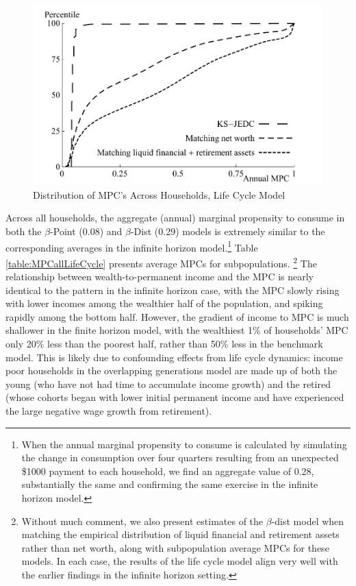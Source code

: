 \documentclass[11pt,a4paper,pdftex]{article}\usepackage[pdftex]{graphicx}\usepackage{epstopdf} \usepackage[pdftex]{hyperref}
\newcommand{\Discount}{\ensuremath{\beta}}
\begin{document}
\begin{figure}
\caption{Distribution of MPC's Across Households, Life Cycle Model}
\begin{center}
\includegraphics[scale=0.75]{../Figures/MPCdistributionLifeCyclePlot.pdf}
\end{center}
\end{figure}

Across all households, the aggregate (annual) marginal propensity to consume in both the \Discount-Point (0.08) and \Discount-Dist (0.29) models is extremely similar to the corresponding averages in the infinite horizon model.\footnote{When the annual marginal propensity to consume is calculated by simulating the change in consumption over four quarters resulting from an unexpected \$1000 payment to each household, we find an aggregate value of 0.28, substantially the same and confirming the same exercise in the infinite horizon model.}  Table \ref{table:MPCallLifeCycle} presents average MPCs for subpopulations.%
\footnote{Without much comment, we also present estimates of the \Discount-dist model when matching the empirical distribution of liquid financial and retirement assets rather than net worth, along with subpopulation average MPCs for these models.  In each case, the results of the life cycle model align very well with the earlier findings in the infinite horizon setting.}  The relationship between wealth-to-permanent income and the MPC is nearly identical to the pattern in the infinite horizon case, with the MPC slowly rising with lower incomes among the wealthier half of the population, and spiking rapidly among the bottom half.  However, the gradient of income to MPC is much shallower in the finite horizon model, with the wealthiest 1\% of households' MPC only 20\% less than the poorest half, rather than 50\% less in the benchmark model.  This is likely due to confounding effects from life cycle dynamics: income poor households in the overlapping generations model are made up of both the young (who have not had time to accumulate income growth) and the retired (whose cohorts began with lower initial permanent income and have experienced the large negative wage growth from retirement).
\end{document}
